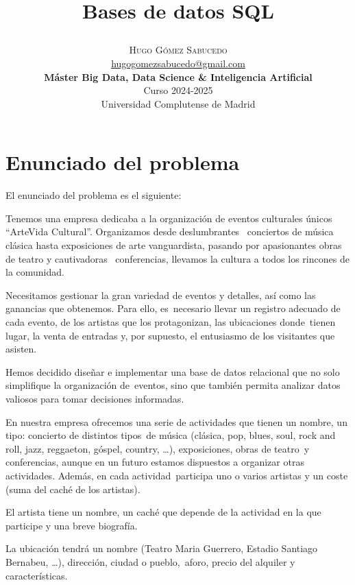 \documentclass[a4paper,onecolumn]{article}
\title{\begin{center} \Huge Bases de datos SQL \end{center}} %
\author{
    \textsc{\Huge Hugo Gómez Sabucedo} \\ %
    \large \href{mailto:hugogomezsabucedo@gmail.com}{hugogomezsabucedo@gmail.com} \\ [2ex] %
    \Large \textbf{Máster Big Data, Data Science \& Inteligencia Artificial} \\
    \normalsize Curso 2024-2025 \\
    \large Universidad Complutense de Madrid
}
\date{} %
\let\stdsection\section
\renewcommand\section{\newpage\stdsection}
\begin{document}
\maketitle
\tableofcontents
\begin{sloppypar}


\section{Enunciado del problema} \label{enunciado}
El enunciado del problema es el siguiente:

Tenemos una empresa dedicaba a la organización de eventos culturales únicos “ArteVida Cultural”. Organizamos desde deslumbrantes \
conciertos de música clásica hasta exposiciones de arte vanguardista, pasando por apasionantes obras de teatro y cautivadoras \
conferencias, llevamos la cultura a todos los rincones de la comunidad.

Necesitamos gestionar la gran variedad de eventos y detalles, así como las ganancias que obtenemos. Para ello, es\
necesario llevar un registro adecuado de cada evento, de los artistas que los protagonizan, las ubicaciones donde\
tienen lugar, la venta de entradas y, por supuesto, el entusiasmo de los visitantes que asisten.

Hemos decidido diseñar e implementar una base de datos relacional que no solo simplifique la organización de\
eventos, sino que también permita analizar datos valiosos para tomar decisiones informadas.

En nuestra empresa ofrecemos una serie de actividades que tienen un nombre, un tipo: concierto de distintos tipos\
de música (clásica, pop, blues, soul, rock and roll, jazz, reggaeton, góspel, country, …), exposiciones, obras de teatro\
y conferencias, aunque en un futuro estamos dispuestos a organizar otras actividades. Además, en cada actividad\
participa uno o varios artistas y un coste (suma del caché de los artistas).

El artista tiene un nombre, un caché que depende de la actividad en la que participe y una breve biografía.

La ubicación tendrá un nombre (Teatro Maria Guerrero, Estadio Santiago Bernabeu, …), dirección, ciudad o pueblo,\
aforo, precio del alquiler y características.


\end{sloppypar}
\end{document}
